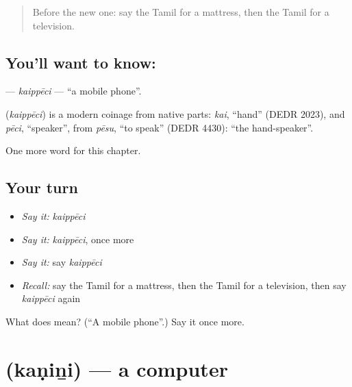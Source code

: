 \label{lesson:TA-C134-kaippeci}



\begin{quote}
Before the new one: say the Tamil for a mattress, then the Tamil for a television.
\end{quote}

\subsection*{You'll want to know: }
\textbf{} — \emph{kaippēci} — \textquotedblleft{}a mobile phone\textquotedblright{}.

\begin{cousinweb}
\textbf{} (\emph{kaippēci}) is a modern coinage from native parts: \emph{kai}, \textquotedblleft{}hand\textquotedblright{} (DEDR 2023), and \emph{pēci}, \textquotedblleft{}speaker\textquotedblright{}, from \emph{pēsu}, \textquotedblleft{}to speak\textquotedblright{} (DEDR 4430): \textquotedblleft{}the hand-speaker\textquotedblright{}.
\end{cousinweb}

\begin{grammarlens}[title={What you've built}]
One more word for this chapter.
\end{grammarlens}

\subsection*{Your turn}
\begin{itemize}
\raggedright
  \item \emph{Say it:} \emph{kaippēci}
  \item \emph{Say it:} \emph{kaippēci}, once more
  \item \emph{Say it:} say \emph{kaippēci}
  \item \emph{Recall:} say the Tamil for a mattress, then the Tamil for a television, then say \emph{kaippēci} again
\end{itemize}

\begin{tcolorbox}[breakable,colback=teal!4,colframe=teal!35!black,title={Before you move on}]
What does  mean? (\textquotedblleft{}A mobile phone\textquotedblright{}.) Say it once more.
\end{tcolorbox}
\section[\texorpdfstring{\ta{கணினி} (kaṇiṉi)}{கணினி (kaṇiṉi)}]{ (kaṇiṉi) — a computer}

